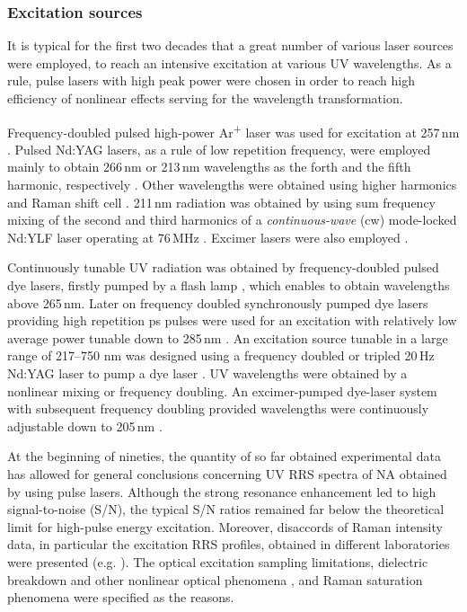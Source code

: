 \subsubsection{Excitation sources}

It is typical for the first two decades that a great number of various laser
sources were employed, to reach an intensive excitation at various UV
wavelengths.
As a rule, pulse lasers with high peak power were chosen in order to reach high
efficiency of nonlinear effects serving for the wavelength transformation.

Frequency-doubled pulsed high-power Ar\textsuperscript{+} laser was used for
excitation at 257\,nm
\parencite{%
	Harada1975,%
	Pezolet1975,%
	Nishimura1977%
}.
Pulsed Nd:YAG lasers, as a rule of low repetition frequency, were employed
mainly to obtain 266\,nm or 213\,nm wavelengths as the forth and the fifth
harmonic, respectively
\parencite{%
	Ziegler1981,%
	Toyama1993%
}.
Other wavelengths were obtained using higher harmonics
\parencite{Kubasek1985}
and  Raman shift cell
\parencite{%
	Fodor1985,%
	Nishimura1987%
}.
211\,nm radiation was obtained by using sum frequency mixing of the second and
third harmonics of a
\emph{continuous-wave} (cw)
mode-locked Nd:YLF laser operating at 76\,MHz
\parencite{Leonard1994}.
Excimer lasers were also employed
\parencite{Ziegler1983}.

Continuously tunable UV radiation was obtained by frequency-doubled pulsed dye
lasers, firstly pumped by a flash lamp
\parencite{%
	Asher1977,%
	Blazej1977%
},
which enables to obtain wavelengths above 265\,nm.
Later on frequency doubled synchronously pumped dye lasers providing high
repetition ps pulses were used for an excitation with relatively low average
power tunable down to 285\,nm
\parencite{%
	Bushaw1978,%
	Samanta1982,%
	Benson1992%
}.
An excitation source tunable in a large range of 217–750 nm was designed using
a frequency doubled or tripled 20\,Hz Nd:YAG laser to pump a dye laser
\parencite{Asher1983}.
UV wavelengths were obtained by a nonlinear mixing or frequency doubling.
An excimer-pumped dye-laser system with subsequent frequency doubling provided
wavelengths were continuously adjustable down to 205\,nm
\parencite{Gfrorer1993a}.

At the beginning of nineties, the quantity of so far obtained experimental data
has allowed for general conclusions concerning UV RRS spectra of NA obtained by
using pulse lasers.
Although the strong resonance enhancement led to high signal-to-noise (S/N),
the typical S/N ratios remained far below the theoretical limit for high-pulse
energy excitation.
Moreover, disaccords of Raman intensity data, in particular the excitation RRS
profiles, obtained in different laboratories were presented (e.g.
\cite{Bushaw1980}).
The optical excitation sampling limitations, dielectric breakdown and other
nonlinear optical phenomena
\parencite{Teraoka1990},
and Raman saturation phenomena
\parencite{%
	Harmon1990,%
	Johnson1986,%
	Ludwig1988a,%
	Song1991a,%
	Sweeney1990,%
	Teraoka1990%
}
were specified as the reasons.

